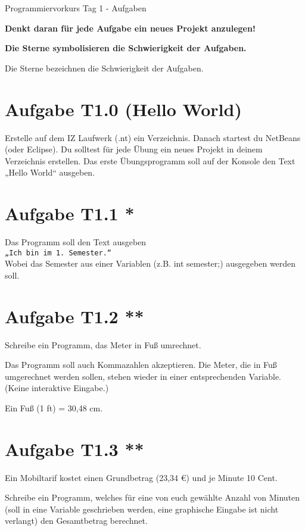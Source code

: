 \documentclass[final,a4paper]{article}
\begin{document}



{\huge Programmiervorkurs Tag 1 - Aufgaben}

\bigskip

\textbf{\color{red}Denkt daran für jede Aufgabe ein neues Projekt anzulegen!}

\textbf{\color{orange}Die Sterne symbolisieren die Schwierigkeit der Aufgaben.}

Die Sterne bezeichnen die Schwierigkeit der Aufgaben.

\section*{Aufgabe T1.0 (Hello World)}
Erstelle auf dem IZ Laufwerk (.nt) ein Verzeichnis.
Danach startest du NetBeans (oder Eclipse).
Du solltest für jede Übung ein neues Projekt in deinem Verzeichnis erstellen.
Das erste Übungsprogramm soll auf der Konsole den Text „Hello World“ ausgeben.

\section*{Aufgabe T1.1 *}
Das Programm soll den Text ausgeben\\
\texttt{„Ich bin im 1. Semester.“}\\
Wobei das Semester aus einer Variablen (z.B. int semester;) ausgegeben werden soll.

\section*{Aufgabe T1.2 **}
Schreibe ein Programm, das Meter in Fuß umrechnet.

Das Programm soll auch Kommazahlen akzeptieren.
Die Meter, die in Fuß umgerechnet werden sollen, stehen wieder in einer entsprechenden Variable.
(Keine interaktive Eingabe.)

Ein Fuß (1 ft) = 30,48 cm.

\section*{Aufgabe T1.3 **}
Ein Mobiltarif kostet einen Grundbetrag (23,34 \euro) und je Minute 10 Cent.

Schreibe ein Programm, welches für eine von euch gewählte Anzahl von Minuten (soll in eine Variable geschrieben werden, eine graphische Eingabe ist nicht verlangt) den Gesamtbetrag berechnet.
\end{document}
